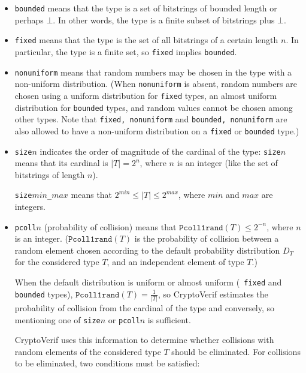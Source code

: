 \begin{itemize}
\begin{itemize}
\item \texttt{bounded} means that the type is a set of bitstrings of
bounded length or perhaps $\bot$. In other words, the type is a finite
subset of bitstrings plus $\bot$.

\item \texttt{fixed} means that the type is the set of all bitstrings of 
a certain length $n$. In particular, the type is a finite set,
so \texttt{fixed} implies \texttt{bounded}. 

\item \texttt{nonuniform} means that random numbers may be chosen in
  the type with a non-uniform distribution. (When \texttt{nonuniform}
  is absent, random numbers are chosen using a uniform distribution
  for {\tt fixed} types, an almost uniform distribution for
  \texttt{bounded} types, and random values cannot be chosen among
  other types. Note that \texttt{fixed, nonuniform} and
  \texttt{bounded, nonuniform} are also allowed to have a non-uniform
  distribution on a \texttt{fixed} or \texttt{bounded} type.)

\item \texttt{size$n$} indicates
the order of magnitude of the cardinal of the type:
\texttt{size$n$} means that its cardinal is $|T| = 2^n$,
where $n$ is an integer
(like the set of bitstrings of length $n$).

\texttt{size$\mathit{min}$\_$\mathit{max}$} means that  $2^{\mathit{min}} \leq |T| \leq 2^{\mathit{max}}$, where $\mathit{min}$ and $\mathit{max}$ are integers.

\item \texttt{pcoll$n$} ({\sc p}robability of {\sc coll}ision) means that $\texttt{Pcoll1rand}(T) \leq 2^{-n}$, where $n$ is an integer.  ($\texttt{Pcoll1rand}(T)$ is the
  probability of collision between a random element chosen according
  to the default probability distribution $D_T$ for the considered
  type $T$, and an independent element of type $T$.)

  When the default distribution is uniform or almost uniform ({\tt
    fixed} and {\tt bounded} types),
  $\texttt{Pcoll1rand}(T) = \frac{1}{|T|}$, so CryptoVerif estimates
  the probability of collision from the cardinal of the type and
  conversely, so mentioning one of \texttt{size$n$} or
  \texttt{pcoll$n$} is sufficient.

CryptoVerif uses this information to determine whether collisions 
with random elements of the considered type $T$ should be eliminated.
For collisions to be eliminated, two conditions must be satisfied:
\begin{enumerate}


\end{enumerate}
\end{itemize}
\end{itemize}
